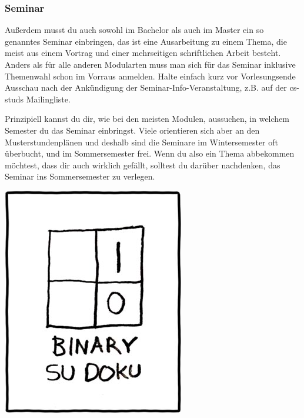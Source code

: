 	\subsubsection{Seminar}
	Außerdem musst du auch sowohl im Bachelor als auch im Master ein so genanntes Seminar einbringen, das ist eine Ausarbeitung zu einem Thema, die meist aus einem Vortrag und einer mehrseitigen schriftlichen Arbeit besteht. Anders als für alle anderen Modularten muss man sich für das Seminar inklusive Themenwahl schon im Vorraus anmelden. Halte einfach kurz vor Vorlesungsende Ausschau nach der Ankündigung der Seminar-Info-Veranstaltung, z.B. auf der cs-studs Mailingliste.

	Prinzipiell kannst du dir, wie bei den meisten Modulen, aussuchen, in welchem Semester du das Seminar einbringst. Viele orientieren sich aber an den Musterstundenplänen und deshalb sind die Seminare im Wintersemester oft überbucht, und im Sommersemester frei. Wenn du also ein Thema abbekommen möchtest, dass dir auch wirklich gefällt, solltest du darüber nachdenken, das Seminar ins Sommersemester zu verlegen.

	\vspace{0.5cm}	
	\includegraphics[totalheight=6cm]{bilder/XKCD/su_doku}
	
